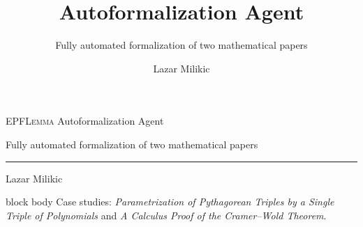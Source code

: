 \documentclass[aspectratio=169,10pt]{beamer}
\title{\method Autoformalization Agent}
\subtitle{Fully automated formalization of two mathematical papers}
\author{Lazar Milikic}
\date{}
\newcommand{\method}{\textsc{EPFLemma}\xspace}
\begin{document}
\begin{frame}[plain]
  \vspace*{1.15cm}
  {\color{epflRed}\LARGE \method Autoformalization Agent\par}
  \vspace{4mm}
  {\large Fully automated formalization of two mathematical papers\par}
  \vspace{4mm}
  {\color{epflRed}\rule{\linewidth}{0.5pt}}
  \vspace{8mm}
  {\large Lazar Milikic\par}
  \vfill
  \small
  \begin{beamercolorbox}[rounded=true,sep=2.5mm,wd=\linewidth]{block body}
    Case studies:
    \emph{Parametrization of Pythagorean Triples by a Single Triple of Polynomials}
    and
    \emph{A Calculus Proof of the Cramer--Wold Theorem}.
  \end{beamercolorbox}
\end{frame}
\end{document}

